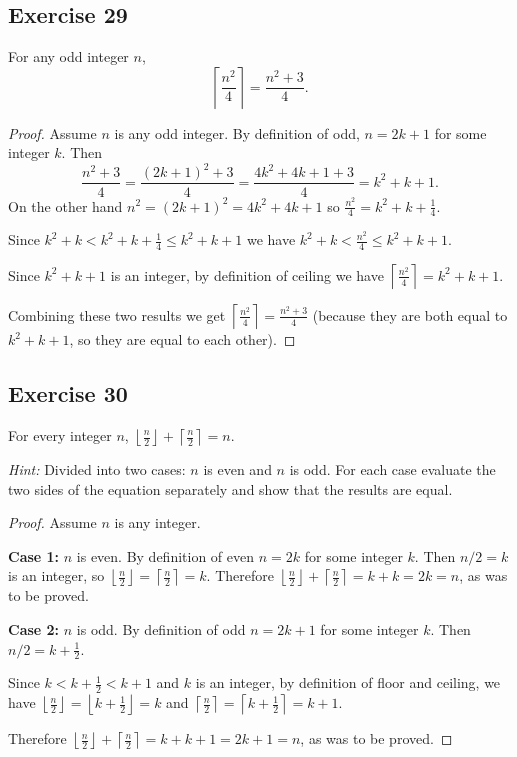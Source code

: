 \documentclass[14pt]{extarticle}
\newcommand{\dps}{\displaystyle}
\newcommand{\floor}[1]{{\left\lfloor#1\right\rfloor}}
\newcommand{\ceil}[1]{{\left\lceil#1\right\rceil}}
\begin{document}
\subsection{Exercise 29}
For any odd integer $n$,
\[
    \ceil{\frac{n^2}{4}} = \frac{n^2+3}{4}.
\]
\begin{proof}
    Assume $n$ is any odd integer. By definition of odd, $n = 2k+1$ for some integer $k$. Then
    \[
        \frac{n^2+3}{4} = \frac{(2k+1)^2+3}{4} = \frac{4k^2 + 4k + 1+3}{4} = k^2+k+1.
    \]
    On the other hand $n^2 = (2k+1)^2 = 4k^2+4k+1$ so $\frac{n^2}{4} = k^2+k+\frac{1}{4}$.

    Since $k^2+k < k^2+k+\frac{1}{4} \leq k^2+k+1$ we have $k^2+k < \frac{n^2}{4} \leq k^2+k+1$.

    Since $k^2+k+1$ is an integer, by definition of ceiling we have $\dps\ceil{\frac{n^2}{4}} = k^2+k+1$.

    Combining these two results we get $\dps\ceil{\frac{n^2}{4}} = \frac{n^2+3}{4}$ (because they are both equal to $k^2+k+1$, so they are equal to each other).
\end{proof}

\subsection{Exercise 30}
For every integer $n$, $\dps \floor{\frac{n}{2}} + \ceil{\frac{n}{2}} = n$.

    {\it Hint:} Divided into two cases: $n$ is even and $n$ is odd. For each case evaluate the two sides of the equation
separately and show that the results are equal.

\begin{proof}
    Assume $n$ is any integer.

        {\bf Case 1:} $n$ is even. By definition of even $n = 2k$ for some integer $k$. Then $n/2 = k$ is an integer, so $\floor{\frac{n}{2}} = \ceil{\frac{n}{2}} = k$. Therefore $\floor{\frac{n}{2}} + \ceil{\frac{n}{2}} = k + k = 2k = n$, as was to be proved.

        {\bf Case 2:} $n$ is odd. By definition of odd $n = 2k+1$ for some integer $k$. Then $n/2 = k+\frac{1}{2}$.

    Since $k < k+\frac{1}{2} < k+1$ and $k$ is an integer, by definition of floor and ceiling, we have $\floor{\frac{n}{2}} = \floor{k+\frac{1}{2}} = k$ and $\ceil{\frac{n}{2}} = \ceil{k+\frac{1}{2}} = k+1$.

    Therefore $\floor{\frac{n}{2}} + \ceil{\frac{n}{2}} = k + k + 1 = 2k+1 = n$, as was to be proved.
\end{proof}
\end{document}
